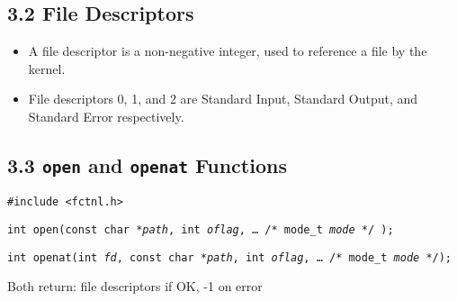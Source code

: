 \documentclass[]{article}
\newcommand{\code}{\texttt}
\begin{document}
\subsection*{3.2 File Descriptors}
\begin{itemize}
\item A file descriptor is a non-negative integer, used to reference a file by
the kernel.
\item File descriptors 0, 1, and 2 are Standard Input, Standard Output, and
Standard Error respectively.
\end{itemize}

\subsection*{3.3 \code{open} and \code{openat} Functions}
\code{\#include <fctnl.h>}

\code{int open(const char *\emph{path}, int \emph{oflag}, \ldots \,/* mode\_t
\emph{mode} */ );}

\code{int openat(int \emph{fd}, const char *\emph{path}, int \emph{oflag},
\ldots\,/* mode\_t \emph{mode} */);}

Both return: file descriptors if OK, -1 on error
\end{document}
